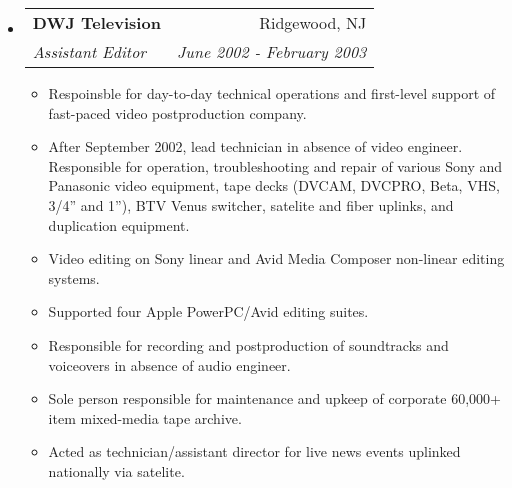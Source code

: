 \documentclass[letterpaper,11pt]{article}
\makeatletter
\newcommand{\resitem}[1]{\item #1 \vspace{-2pt}}
\newcommand{\ressubheading}[4]{
\begin{tabular*}{7.0in}{l@{\extracolsep{\fill}}r}
		\textbf{#1} & #2 \\
		\textit{#3} & \textit{#4} \\
\end{tabular*}\vspace{-6pt}}
\makeatother
\begin{document}
\begin{itemize}
\item
        \ressubheading{DWJ Television}{Ridgewood, NJ}{Assistant Editor}{June 2002 - February 2003}
        \begin{itemize}
                \resitem{Respoinsble for day-to-day technical operations and
                  first-level support of fast-paced video postproduction
                  company.}
                \resitem{After September 2002, lead technician in
                  absence of video engineer. Responsible for operation,
                  troubleshooting and repair of various Sony and Panasonic video equipment,
                  tape decks (DVCAM, DVCPRO, Beta, VHS, 3/4'' and 1''), BTV
                  Venus switcher, satelite and fiber uplinks, and duplication
                  equipment.}
                \resitem{Video editing on Sony linear and Avid Media Composer
                  non-linear editing systems.}
                \resitem{Supported four Apple PowerPC/Avid editing suites.}
                \resitem{Responsible for recording and postproduction of
                  soundtracks and voiceovers in absence of audio engineer.}
                \resitem{Sole person responsible for maintenance and upkeep of corporate
                  60,000+ item mixed-media tape archive.}
                \resitem{Acted as technician/assistant director for live
                  news events uplinked nationally via satelite.}
        \end{itemize}

\end{itemize}
\end{document}
